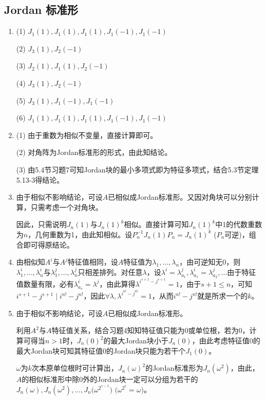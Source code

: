 \documentclass[a4paper,UTF8,fontset=windows]{ctexart}
\begin{document}
\subsection{Jordan 标准形}
\begin{enumerate}
\item 
(1) $J_1(1),J_1(1),J_1(1),J_1(-1),J_1(-1)$

(2) $J_3(1),J_2(-1)$

(3) $J_2(1),J_1(1),J_2(-1)$

(4) $J_3(1),J_2(-1)$

(5) $J_3(1),J_1(-1),J_1(-1)$ 

(6) $J_1(1),J_1(1),J_1(1),J_1(-1),J_1(-1)$

\item
(1) 由于重数为相似不变量，直接计算即可。

(2) 对角阵为Jordan标准形的形式，由此知结论。

(3) 由5.4节习题7可知Jordan块的最小多项式即为特征多项式，结合5.3节定理5.13-3得结论。

\item
由于相似不影响结论，可设$A$已相似成Jordan标准形。又因对角块可以分别计算，只需考虑一个对角块。

因此，只需说明$J_n(1)$与$J_n(1)^k$相似。直接计算可知$J_n(1)^k$中1的代数重数为$n$，几何重数为1，由此知相似。设$P_n^{-1}J_n(1)P_n=J_n(1)^k$ ($P_n$可逆)，组合即可得原结论。

\item
由相似知$A^i$与$A^j$特征值相同，设$A$特征值为$\lambda_1,\dots,\lambda_n$，由可逆知无0，则$\lambda_1^i,\dots,\lambda_n^i$与$\lambda_1^j,\dots,\lambda_n^j$只相差排列。对任意$\lambda$，设$\lambda^i=\lambda_{a_1}^j,\lambda_{a_1}^i=\lambda_{a_2}^j,\dots$由于特征值数量有限，必有$\lambda_{a_s}^i=\lambda^j$，由此算得$\lambda^{i^{s+1}-j^{s+1}}=1$，由于$s+1\le n$，可知$i^{s+1}-j^{s+1}\mid i^{n!}-j^{n!}$，因此$\forall\lambda,\lambda^{i^{n!}-j^{n!}}=1$，从而$i^{n!}-j^{n!}$就是所求一个的$k$。

\item
由于相似不影响结论，可设$A$已相似成Jordan标准形。

利用$A^2$与$A$特征值关系，结合习题4知知特征值只能为0或单位根，若为0，计算可得当$n>1$时，$J_n(0)^2$的最大Jordan块小于$J_n(0)$，由此考虑特征值0的最大Jordan块可知其特征值0的Jordan块只能为若干个$J_1(0)$。

$\omega$为$k$次本原单位根时可计算出，$J_n(\omega)^2$的Jordan标准形为$J_n(\omega^2)$，由此，$A$的相似标准形中除0外的Jordan块一定可以分组为若干的$J_n(\omega),J_n(\omega^2),\dots,J_n\big(\omega^{2^{s-1}}\big)$ $\big(\omega^{2^s}=\omega\big)$。


\end{enumerate}
\end{document}
